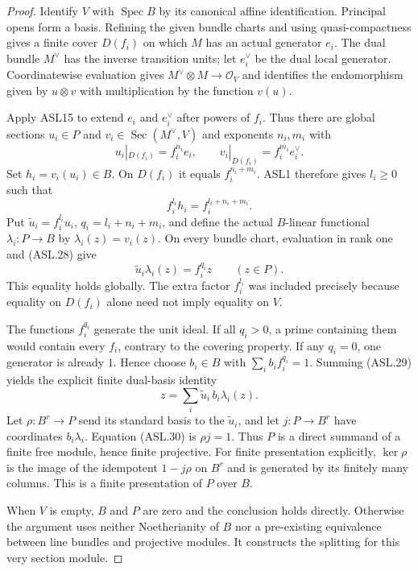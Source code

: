 \begin{proof}
Identify $V$ with $\operatorname{Spec}B$ by its canonical affine
identification.  Principal opens form a basis.  Refining the
given bundle charts and using quasi-compactness gives a finite
cover $D(f_i)$ on which $M$ has an actual generator $e_i$.
The dual bundle $M^\vee$ has the inverse transition units;
let $e_i^\vee$ be the dual local generator.  Coordinatewise
evaluation gives $M^\vee\otimes M\to\mathcal O_V$ and identifies
the endomorphism given by $u\otimes v$ with multiplication by
the function $v(u)$.

Apply ASL15 to extend $e_i$ and $e_i^\vee$ after powers of $f_i$.
Thus there are global sections $u_i\in P$ and
$v_i\in\operatorname{Sec}(M^\vee,V)$ and exponents $n_i,m_i$
with
\[
 u_i|_{D(f_i)}=f_i^{n_i}e_i,\qquad
 v_i|_{D(f_i)}=f_i^{m_i}e_i^\vee.
\]
Set $h_i=v_i(u_i)\in B$.  On $D(f_i)$ it equals
$f_i^{n_i+m_i}$.  ASL1 therefore gives $l_i\ge0$ such that
\[
               f_i^{l_i}h_i=f_i^{l_i+n_i+m_i}.       \tag{ASL.28}
\]
Put $\widetilde u_i=f_i^{l_i}u_i$,
$q_i=l_i+n_i+m_i$, and define the actual $B$-linear functional
$\lambda_i:P\to B$ by $\lambda_i(z)=v_i(z)$.
On every bundle chart, evaluation in rank one and (ASL.28) give
\[
                 \widetilde u_i\lambda_i(z)=f_i^{q_i}z
                       \qquad(z\in P).               \tag{ASL.29}
\]
This equality holds globally.  The extra factor $f_i^{l_i}$
was included precisely because equality on $D(f_i)$ alone
need not imply equality on $V$.

The functions $f_i^{q_i}$ generate the unit ideal.  If all
$q_i>0$, a prime containing them would contain every $f_i$,
contrary to the covering property.  If any $q_i=0$, one
generator is already $1$.  Hence choose $b_i\in B$ with
$\sum_i b_if_i^{q_i}=1$.  Summing (ASL.29) yields the
explicit finite dual-basis identity
\[
                    z=\sum_i\widetilde u_i\,
                                      b_i\lambda_i(z).  \tag{ASL.30}
\]
Let $\rho:B^r\to P$ send its standard basis to the
$\widetilde u_i$, and let
$j:P\to B^r$ have coordinates $b_i\lambda_i$.
Equation (ASL.30) is $\rho j=1$.  Thus $P$ is a direct
summand of a finite free module, hence finite projective.
For finite presentation explicitly, $\ker\rho$ is the image
of the idempotent $1-j\rho$ on $B^r$ and is generated by
its finitely many columns.  This is a finite presentation
of $P$ over $B$.

When $V$ is empty, $B$ and $P$ are zero and the conclusion
holds directly.  Otherwise the argument uses neither
Noetherianity of $B$ nor a pre-existing equivalence between
line bundles and projective modules.  It constructs the
splitting for this very section module.
\end{proof}


